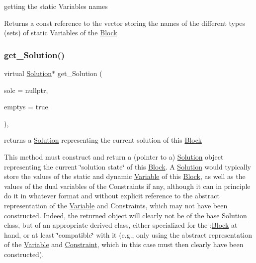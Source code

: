 getting the static Variables\textquotesingle{} names 

Returns a const reference to the vector storing the names of the different types (sets) of static Variables of the \mbox{\hyperlink{class_s_m_spp__di__unipi__it_1_1_block}{Block}} \mbox{\label{class_s_m_spp__di__unipi__it_1_1_block_a1db67c2f65111af4314e79dfc81ba597}} 
\subsubsection{\texorpdfstring{get\+\_\+\+Solution()}{get\_Solution()}}
{\footnotesize\ttfamily virtual \mbox{\hyperlink{class_s_m_spp__di__unipi__it_1_1_solution}{Solution}}$\ast$ get\+\_\+\+Solution (\begin{DoxyParamCaption}\item[{\mbox{\hyperlink{class_s_m_spp__di__unipi__it_1_1_configuration}{Configuration}} $\ast$}]{solc = {\ttfamily nullptr},  }\item[{bool}]{emptys = {\ttfamily true} }\end{DoxyParamCaption})\hspace{0.3cm}{\ttfamily [inline]}, {\ttfamily [virtual]}}



returns a \mbox{\hyperlink{class_s_m_spp__di__unipi__it_1_1_solution}{Solution}} representing the current solution of this \mbox{\hyperlink{class_s_m_spp__di__unipi__it_1_1_block}{Block}} 

This method must construct and return a (pointer to a) \mbox{\hyperlink{class_s_m_spp__di__unipi__it_1_1_solution}{Solution}} object representing the current \char`\"{}solution state\char`\"{} of this \mbox{\hyperlink{class_s_m_spp__di__unipi__it_1_1_block}{Block}}. A \mbox{\hyperlink{class_s_m_spp__di__unipi__it_1_1_solution}{Solution}} would typically store the values of the static and dynamic \mbox{\hyperlink{class_s_m_spp__di__unipi__it_1_1_variable}{Variable}} of this \mbox{\hyperlink{class_s_m_spp__di__unipi__it_1_1_block}{Block}}, as well as the values of the dual variables of the Constraints if any, although it can in principle do it in whatever format and without explicit reference to the abstract representation of the \mbox{\hyperlink{class_s_m_spp__di__unipi__it_1_1_variable}{Variable}} and Constraints, which may not have been constructed. Indeed, the returned object will clearly not be of the base \mbox{\hyperlink{class_s_m_spp__di__unipi__it_1_1_solution}{Solution}} class, but of an appropriate derived class, either specialized for the \+:\mbox{\hyperlink{class_s_m_spp__di__unipi__it_1_1_block}{Block}} at hand, or at least \char`\"{}compatible\char`\"{} with it (e.\+g., only using the abstract representation of the \mbox{\hyperlink{class_s_m_spp__di__unipi__it_1_1_variable}{Variable}} and \mbox{\hyperlink{class_s_m_spp__di__unipi__it_1_1_constraint}{Constraint}}, which in this case must then clearly have been constructed).

